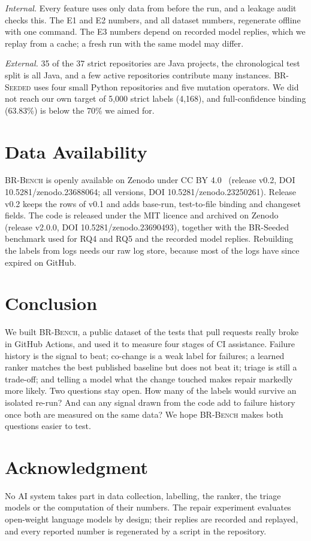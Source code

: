 \documentclass[10pt,conference]{IEEEtran}
\newcommand{\brb}{\textsc{BR-Bench}}
\newcommand{\brs}{\textsc{BR-Seeded}}
\begin{document}
\textit{Internal.} Every feature uses only data from before the run, and a leakage audit checks this. The E1 and E2 numbers, and all dataset numbers, regenerate offline with one command. The E3 numbers depend on recorded model replies, which we replay from a cache; a fresh run with the same model may differ.

\textit{External.} 35 of the 37 strict repositories are Java projects, the chronological test split is all Java, and a few active repositories contribute many instances. \brs{} uses four small Python repositories and five mutation operators. We did not reach our own target of 5,000 strict labels (4,168), and full-confidence binding (63.83\%) is below the 70\% we aimed for.

\section{Data Availability}

\brb{} is openly available on Zenodo under CC BY 4.0~\cite{brbench_data} (release v0.2, DOI 10.5281/zenodo.23688064; all versions, DOI 10.5281/zenodo.23250261). Release v0.2 keeps the rows of v0.1 and adds base-run, test-to-file binding and changeset fields. The code is released under the MIT licence and archived on Zenodo~\cite{brbench_code} (release v2.0.0, DOI 10.5281/zenodo.23690493), together with the BR-Seeded benchmark used for RQ4 and RQ5 and the recorded model replies. Rebuilding the labels from logs needs our raw log store, because most of the logs have since expired on GitHub.

\section{Conclusion}

We built \brb{}, a public dataset of the tests that pull requests really broke in GitHub Actions, and used it to measure four stages of CI assistance. Failure history is the signal to beat; co-change is a weak label for failures; a learned ranker matches the best published baseline but does not beat it; triage is still a trade-off; and telling a model what the change touched makes repair markedly more likely. Two questions stay open. How many of the labels would survive an isolated re-run? And can any signal drawn from the code add to failure history once both are measured on the same data? We hope \brb{} makes both questions easier to test.

\section*{Acknowledgment}
 No AI system takes part in data collection, labelling, the ranker, the triage models or the computation of their numbers. The repair experiment evaluates open-weight language models by design; their replies are recorded and replayed, and every reported number is regenerated by a script in the repository.
\end{document}
